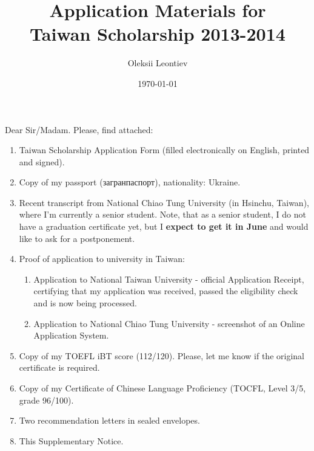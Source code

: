 \documentclass[8pt]{article} %
\title{Application Materials for\\Taiwan Scholarship 2013-2014
}
\author{Oleksii Leontiev}
\date{\selectlanguage{english}\today}
\begin{document}
\begin{CJK}{UTF8}{bsmi}
\maketitle
\end{CJK}

Dear Sir/Madam. Please, find attached:
\begin{enumerate}
	\item{Taiwan Scholarship Application Form (filled electronically on English, printed and signed).}
	\item{Copy of my passport (загранпаспорт), nationality: Ukraine.}
	\item{Recent transcript from National Chiao Tung University (in Hsinchu, Taiwan), where I'm currently a senior student.
		Note, that as a senior student, I do not have a graduation certificate yet,
		but I \textbf{expect to get it in June} and would like to ask for a postponement.}
	\item{Proof of application to university in Taiwan:
		\begin{enumerate}
			\item{Application to National Taiwan University - official Application Receipt, certifying that my application was received, passed the eligibility
				check and is now being processed.}
			\item{Application to National Chiao Tung University - screenshot of an Online Application System.}
		\end{enumerate}}%
	\item{Copy of my TOEFL iBT score (112/120). Please, let me know if the original certificate is required.}
	\item{Copy of my Certificate of Chinese Language Proficiency (TOCFL, Level 3/5, grade 96/100).}
	\item{Two recommendation letters in sealed envelopes.}
	\item{This Supplementary Notice.}
\end{enumerate}
\end{document}
